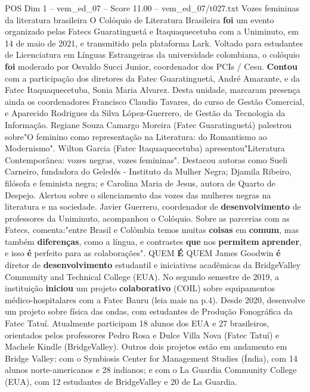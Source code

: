 \begin{textsample}{POS Dim 1 – vem\_ed\_07 – Score 11.00 – vem\_ed\_07/t027.txt}  \label{ex:f1_pos_183}
Vozes femininas da literatura brasileira O Colóquio de Literatura Brasileira \textbf{foi} um evento organizado pelas Fatecs Guaratinguetá e Itaquaquecetuba com a Uniminuto, em 14 de maio de 2021, e transmitido pela plataforma Lark.
Voltado para estudantes de Licenciatura em Línguas Estrangeiras da universidade colombiana, o colóquio \textbf{foi} moderado por Osvaldo Succi Junior, coordenador dos PCIs / Cesu. \textbf{Contou} com a participação dos diretores da Fatec Guaratinguetá, André Amarante, e da Fatec Itaquaquecetuba, Sonia Maria Alvarez.
Desta unidade, marcaram presença ainda os coordenadores Francisco Claudio Tavares, do curso de Gestão Comercial, e Aparecido Rodrigues da Silva López-Guerrero, de Gestão da Tecnologia da Informação.
Regiane Souza Camargo Moreira (Fatec Guaratinguetá) palestrou sobre"O feminino como representação na Literatura: do Romantismo ao Modernismo".
Wilton Garcia (Fatec Itaquaquecetuba) apresentou"Literatura Contemporânea: vozes negras, vozes femininas".
Destacou autoras como Sueli Carneiro, fundadora do Geledés - Instituto da Mulher Negra; Djamila Ribeiro, filósofa e feminista negra; e Carolina Maria de Jesus, autora de Quarto de Despejo.
Alertou sobre o silenciamento das vozes das mulheres negras na literatura e na sociedade.
Javier Guerrero, coordenador de \textbf{desenvolvimento} de professores da Uniminuto, acompanhou o Colóquio.
Sobre as parcerias com as Fatecs, comenta:"entre Brasil e Colômbia temos muitas \textbf{coisas} em \textbf{comum}, mas também \textbf{diferenças}, como a língua, e contrastes \textbf{que} nos \textbf{permitem} \textbf{aprender}, e isso \textbf{é} perfeito para as colaborações".
QUEM \textbf{É} QUEM James Goodwin \textbf{é} diretor de \textbf{desenvolvimento} estudantil e iniciativas acadêmicas da BridgeValley Community and Technical College (EUA).
No segundo semestre de 2019, a instituição \textbf{iniciou} um projeto \textbf{colaborativo} (COIL) sobre equipamentos médico-hospitalares com a Fatec Bauru (leia mais na p.4).
Desde 2020, desenvolve um projeto sobre física das ondas, com estudantes de Produção Fonográfica da Fatec Tatuí.
Atualmente participam 18 alunos dos EUA e 27 brasileiros, orientados pelos professores Pedro Rosa e Dulce Villa Nova (Fatec Tatuí) e Machele Kindle (BridgeValley).
Outros dois projetos estão em andamento em Bridge Valley: com o Symbiosis Center for Management Studies (Índia), com 14 alunos norte-americanos e 28 indianos; e com o La Guardia Community College (EUA), com 12 estudantes de BridgeValley e 20 de La Guardia.

\end{textsample}
